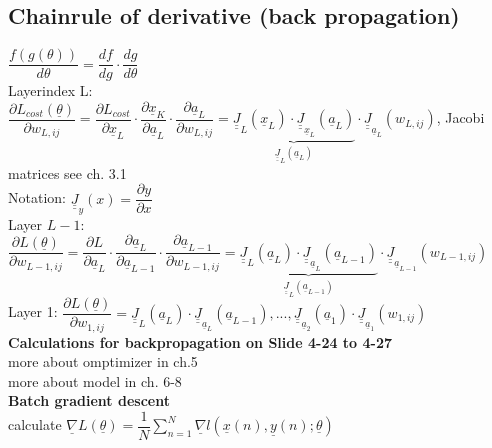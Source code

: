 \subsection{Chainrule of derivative (back propagation)} 
$\dfrac{ f(g(\theta))}{d \theta} = \dfrac{df}{dg} \cdot \dfrac{dg}{d \theta} $ \\
Layerindex L: $  \dfrac{\partial L_{cost}(\underline{\theta})}{\partial w_{L,ij}} = \dfrac{\partial L_{cost} }{\partial \underline{x}_{L}} \cdot \dfrac{\partial \underline{x}_K}{\partial \underline{a}_L} \cdot \dfrac{\partial \underline{a}_L }{\partial w_{L,ij}} = \underbrace{ \underline{\underline{J}}_L (\underline{x}_L) \cdot \underline{\underline{J}}_{\underline{x}_L}(\underline{a}_L)}_{\underline{\underline{J}}_L (\underline{a}_L)} \cdot \underline{\underline{J}}_{\underline{a}_L} (w_{L,ij}) $, Jacobi matrices see ch. 3.1\\
Notation: $ \underline{\underline{J}}_y (x ) = \dfrac{\partial y}{\partial x}  $ \\
Layer $ L-1$:\\
$ \dfrac{\partial L (\underline{\theta})}{\partial w _{L-1, ij}} = \dfrac{\partial L}{\partial \underline{a}_L} \cdot \dfrac{\partial \underline{a}_L}{\partial \underline{a}_{L-1}} \cdot \dfrac{\partial  \underline{a}_{L-1}}{\partial w_{L-1,ij}} = \underbrace{ \underline{\underline{J}}_L (\underline{a}_L) \cdot \underline{\underline{J}}_{\underline{a}_L} (\underline{a}_{L-1})}_{\underline{\underline{J}}_L(\underline{a}_{L-1})} \cdot \underline{\underline{J}}_{\underline{a}_{L-1}}(w_{L-1,ij}) $ \\
Layer 1: $ \dfrac{\partial L (\underline{\theta})}{\partial w_{1,ij}} = \underline{\underline{J}}_L ( \underline{a}_L) \cdot \underline{\underline{J}}_{\underline{a}_L}(\underline{a}_{L-1}) , ..., \underline{\underline{J}}_{\underline{a}_2}(\underline{a}_1) \cdot \underline{\underline{J}}_{\underline{a}_1} (w_{1,ij}) $ \\
\textbf{Calculations for backpropagation on Slide 4-24 to 4-27}\\
more about omptimizer in ch.5 \\
more about model in ch. 6-8 \\
\textbf{Batch gradient descent }\\
calculate $  \underline{\nabla} L (\underline{\theta}) = \dfrac{1}{N} \sum_{n=1}^{N} \underline{\nabla } l(\underline{x}(n) , \underline{y} (n); \underline{\theta}) $ \\
